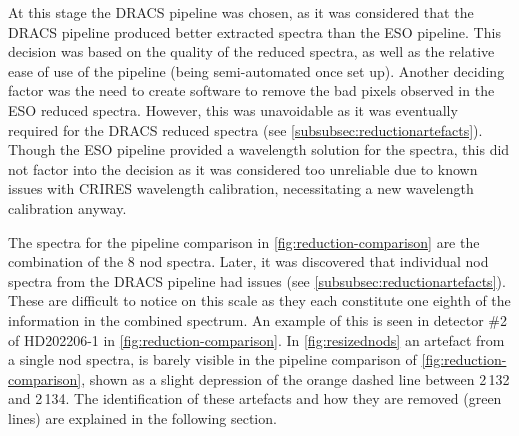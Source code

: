 At this stage the {DRACS} pipeline was chosen, as it was considered that the {DRACS} pipeline produced better extracted spectra than the {ESO} pipeline.
This decision was based on the quality of the reduced spectra, as well as the relative ease of use of the pipeline (being semi-automated once set up).
Another deciding factor was the need to create software to remove the bad pixels observed in the {ESO} reduced spectra.
However, this was unavoidable as it was eventually required for the {DRACS} reduced spectra (see \cref{subsubsec:reductionartefacts}).
Though the {ESO} pipeline provided a wavelength solution for the spectra, this did not factor into the decision as it was considered too unreliable due to known issues with {CRIRES} wavelength calibration, necessitating a new wavelength calibration anyway.

The spectra for the pipeline comparison in \cref{fig:reduction-comparison} are the combination of the 8 nod spectra.
Later, it was discovered that individual nod spectra from the {DRACS} pipeline had issues (see \cref{subsubsec:reductionartefacts}).
These are difficult to notice on this scale as they each constitute one eighth of the information in the combined spectrum.
An example of this is seen in detector \#2 of {HD202206-1} in \cref{fig:reduction-comparison}.
In \cref{fig:resizednods} an artefact from a single nod spectra, is barely visible in the pipeline comparison of \cref{fig:reduction-comparison}, shown as a slight depression of the orange dashed line between 2\,132 and 2\,134\nm{}.
The identification of these artefacts and how they are removed (green lines) are explained in the following section.

